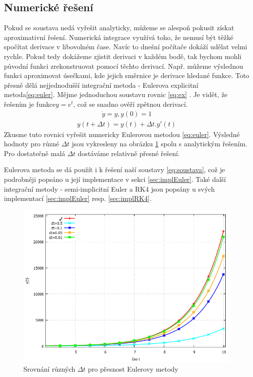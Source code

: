 \subsection{Numerické řešení}
\label{sec:numReseni}
Pokud se soustava nedá vyřešit analyticky, můžeme se alespoň pokusit získat aproximativní řešení. Numerická integrace využívá toho, že nemusí být těžké spočítat derivace v libovolném čase. Navíc to dnešní počítače dokáží udělat velmi rychle. Pokud tedy dokážeme zjistit derivaci v každém bodě, tak bychom mohli původní funkci zrekonstruovat pomocí těchto derivací. Např. můžeme výslednou funkci aproximovat úsečkami, kde jejich směrnice je derivace hledané funkce. Toto přesně dělá nejjednodušší integrační metoda - Eulerova explicitní metoda\eqref{eq:euler}.
Mějme jednoduchou soustavu rovnic \eqref{eq:ex} . Je vidět, že řešením je funkce$ y=e^t $, což se snadno ověří zpětnou derivací. 
\begin{align} \label{eq:ex}
\dot	y = y, y(0)=1
\end{align}
\begin{align} \label{eq:euler}
y(t+\Delta t) = y(t) + \Delta t . y'(t)
\end{align}
Zkusme tuto rovnici vyřešit numericky Eulerovou metodou \eqref{eq:euler}. 
Výsledné hodnoty pro různé  $ \Delta t $ jsou vykresleny na obrázku \ref{fig:euler} spolu s analytickým řešením.
Pro dostatečně malá  $ \Delta t $ dostáváme relativně přesné řešení.

Eulerova metoda se dá použít i k řešení naší soustavy \eqref{eq:soustava}, což je podrobněji popsáno u její implementace v sekci \ref{sec:implEuler}. Také další integrační metody - semi-implicitní Euler a RK4 jsou popsány u svých implementací
\ref{sec:implEuler} resp. \ref{sec:implRK4}.
\begin{figure}[p]
	\caption{Srovnání různých $ \Delta t $ pro přesnost Eulerovy metody}
	\label{fig:euler}
	\centering
	\includegraphics[width=\linewidth]{Figs/eulerTable}
\end{figure}









